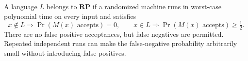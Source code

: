 
A language $L$ belongs to $\mathbf{RP}$ if a randomized machine runs in worst-case polynomial time on every input and satisfies
\[
x\notin L\Longrightarrow\Pr(M(x)\text{ accepts})=0,\qquad
x\in L\Longrightarrow\Pr(M(x)\text{ accepts})\ge\tfrac12.
\]
There are no false positive acceptances, but false negatives are permitted. Repeated independent runs can make the false-negative probability arbitrarily small without introducing false positives.
